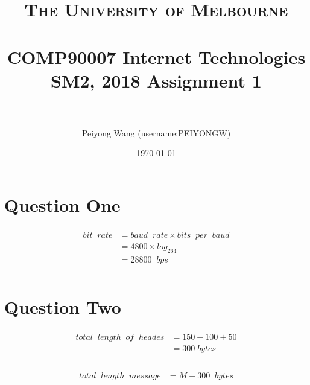 \documentclass[paper=a4, fontsize=11pt]{scrartcl} %
\title{	
\normalfont \normalsize 
\textsc{The University of Melbourne } \\ [25pt] %
\horrule{0.5pt} \\[0.4cm] %
\huge COMP90007 Internet Technologies SM2, 2018
Assignment 1 \\ %
\horrule{2pt} \\[0.5cm] %
}
\author{Peiyong Wang   (username:PEIYONGW)} %
\date{\normalsize\today} %
\numberwithin{equation}{section} %
\numberwithin{figure}{section} %
\numberwithin{table}{section} %
\begin{document}
\maketitle %


\section{Question One}


\begin{align} 
\begin{split}
bit\;\;rate 	&= baud\;\;rate\times bits\;\;per\;\;baud\\
&=4800\times log_264\\
&=28800\;\;bps\\
\end{split}					
\end{align}



\section{Question Two}



\begin{align}
	\begin{split}
		total\;\;length\;\;of\;\;heades&=150+100+50\\&=300\;bytes\\	
	\end{split}
\end{align}

\begin{align}
	\begin{split}
		total\;\;length\;\;message&=M+300\;\;bytes\\
	\end{split}
\end{align}
\end{document}
